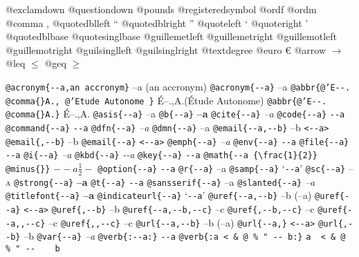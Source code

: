 \documentclass{book}
\begin{document}
@exclamdown \textexclamdown{}
@questiondown \textquestiondown{}
@pounds \textsterling{}
@registeredsymbol \circledR{}
@ordf \textordfeminine{}
@ordm \textordmasculine{}
@comma ,
@quotedblleft \textquotedblleft{}
@quotedblright \textquotedblright{}
@quoteleft \textquoteleft{}
@quoteright \textquoteright{}
@quotedblbase \quotedblbase{}
@quotesinglbase \quotesinglbase{}
@guillemetleft \guillemotleft{}
@guillemetright \guillemotright{}
@guillemotleft \guillemotleft{}
@guillemotright \guillemotright{}
@guilsinglleft \guilsinglleft{}
@guilsinglright \guilsinglright{}
@textdegree \textdegree{}
@euro \euro{}
@arrow $\rightarrow{}$
@leq $\leq{}$
@geq $\geq{}$

\texttt{@acronym\{{-}{-}a,an accronym\}} --a (an accronym)
\texttt{@acronym\{{-}{-}a\}} --a
\texttt{@abbr\{@'E{-}{-}. @comma\{\}A., @'Etude Autonome \}} \'{E}--.\@ ,A.\@ (\'{E}tude Autonome)
\texttt{@abbr\{@'E{-}{-}. @comma\{\}A.\}} \'{E}--.\@ ,A.\@
\texttt{@asis\{{-}{-}a\}} --a
\texttt{@b\{{-}{-}a\}} \textbf{--a}
\texttt{@cite\{{-}{-}a\}} \textit{--a}
\texttt{@code\{{-}{-}a\}} \texttt{{-}{-}a}
\texttt{@command\{{-}{-}a\}} \texttt{{-}{-}a}
\texttt{@dfn\{{-}{-}a\}} \emph{--a}
\texttt{@dmn\{{-}{-}a\}} --a
\texttt{@email\{{-}{-}a,{-}{-}b\}} --b \texttt{<{-}{-}a>}
\texttt{@email\{,{-}{-}b\}} --b
\texttt{@email\{{-}{-}a\}} \texttt{<{-}{-}a>}
\texttt{@emph\{{-}{-}a\}} \emph{--a}
\texttt{@env\{{-}{-}a\}} \texttt{{-}{-}a}
\texttt{@file\{{-}{-}a\}} \texttt{{-}{-}a}
\texttt{@i\{{-}{-}a\}} \textit{--a}
\texttt{@kbd\{{-}{-}a\}} {\ttfamily\textsl{{-}{-}a}}
\texttt{@key\{{-}{-}a\}} \texttt{{-}{-}a}
\texttt{@math\{{-}{-}a \{\textbackslash{}frac\{1\}\{2\}\} @minus\{\}\}} $--a {\frac{1}{2}} -$
\texttt{@option\{{-}{-}a\}} \texttt{{-}{-}a}
\texttt{@r\{{-}{-}a\}} \textrm{--a}
\texttt{@samp\{{-}{-}a\}} `\texttt{{-}{-}a}'
\texttt{@sc\{{-}{-}a\}} \textsc{--a}
\texttt{@strong\{{-}{-}a\}} \textbf{--a}
\texttt{@t\{{-}{-}a\}} \texttt{{-}{-}a}
\texttt{@sansserif\{{-}{-}a\}} \textsf{--a}
\texttt{@slanted\{{-}{-}a\}} \textsl{--a}
\texttt{@titlefont\{{-}{-}a\}} {\Huge \bfseries --a}
\texttt{@indicateurl\{{-}{-}a\}} `\texttt{{-}{-}a}'
\texttt{@uref\{{-}{-}a,{-}{-}b\}} --b (--a)
\texttt{@uref\{{-}{-}a\}} \texttt{<{-}{-}a>}
\texttt{@uref\{,{-}{-}b\}} --b
\texttt{@uref\{{-}{-}a,{-}{-}b,{-}{-}c\}} --c
\texttt{@uref\{,{-}{-}b,{-}{-}c\}} --c
\texttt{@uref\{{-}{-}a,,{-}{-}c\}} --c
\texttt{@uref\{,,{-}{-}c\}} --c
\texttt{@url\{{-}{-}a,{-}{-}b\}} --b (--a)
\texttt{@url\{{-}{-}a,\}} \texttt{<{-}{-}a>}
\texttt{@url\{,{-}{-}b\}} --b
\texttt{@var\{{-}{-}a\}} \emph{--a}
\texttt{@verb\{:{-}{-}a:\}} \verb:--a:
\texttt{@verb\{:a  < \& @ \% " {-}{-}    b:\}} \verb:a  < & @ % " --    b:
\end{document}
